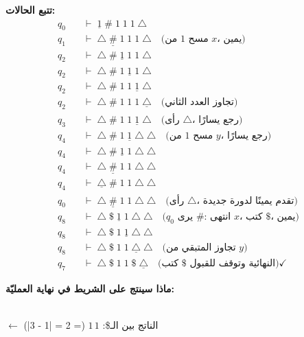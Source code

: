 \begin{boxSolution}
\begin{enumerate}[itemsep=1.5em, label=\alph*.]
\textbf{تتبع الحالات:}
{\small
\begin{align*}
q_0 \quad &\vdash \; \underline{1} \; \# \; 1 \; 1 \; 1 \; \triangle \\
q_1 \quad &\vdash \; \triangle \; \underline{\#} \; 1 \; 1 \; 1 \; \triangle \quad \text{(مسح 1 من $x$، يمين)} \\
q_2 \quad &\vdash \; \triangle \; \# \; \underline{1} \; 1 \; 1 \; \triangle \\
q_2 \quad &\vdash \; \triangle \; \# \; 1 \; \underline{1} \; 1 \; \triangle \\
q_2 \quad &\vdash \; \triangle \; \# \; 1 \; 1 \; \underline{1} \; \triangle \\
q_2 \quad &\vdash \; \triangle \; \# \; 1 \; 1 \; 1 \; \underline{\triangle} \quad \text{(تجاوز العدد الثاني)} \\
q_3 \quad &\vdash \; \triangle \; \# \; 1 \; 1 \; \underline{1} \; \triangle \quad \text{(رأى $\triangle$، رجع يسارًا)} \\
q_4 \quad &\vdash \; \triangle \; \# \; 1 \; \underline{1} \; \triangle \; \triangle \quad \text{(مسح 1 من $y$، رجع يسارًا)} \\
q_4 \quad &\vdash \; \triangle \; \# \; \underline{1} \; 1 \; \triangle \; \triangle \\
q_4 \quad &\vdash \; \triangle \; \underline{\#} \; 1 \; 1 \; \triangle \; \triangle \\
q_4 \quad &\vdash \; \underline{\triangle} \; \# \; 1 \; 1 \; \triangle \; \triangle \\
q_0 \quad &\vdash \; \triangle \; \underline{\#} \; 1 \; 1 \; \triangle \; \triangle \quad \text{(رأى $\triangle$، تقدم يمينًا لدورة جديدة)} \\
q_8 \quad &\vdash \; \triangle \; \$ \; \underline{1} \; 1 \; \triangle \; \triangle \quad \text{($q_0$ يرى $\#$: انتهى $x$، كتب $\$$، يمين)} \\
q_8 \quad &\vdash \; \triangle \; \$ \; 1 \; \underline{1} \; \triangle \; \triangle \\
q_8 \quad &\vdash \; \triangle \; \$ \; 1 \; 1 \; \underline{\triangle} \; \triangle \quad \text{(تجاوز المتبقي من $y$)} \\
q_7 \quad &\vdash \; \triangle \; \$ \; 1 \; 1 \; \$ \; \underline{\triangle} \quad \text{(كتب $\$$ النهائية وتوقف للقبول)} \checkmark
\end{align*}
}

\textbf{ماذا سينتج على الشريط في نهاية العمليّة:}
\\
$\leftarrow$ الناتج بين الـ\$: $1\,1$ (= 2 = |1 - 3|) \checkmark \\

\end{enumerate}
\end{boxSolution}

